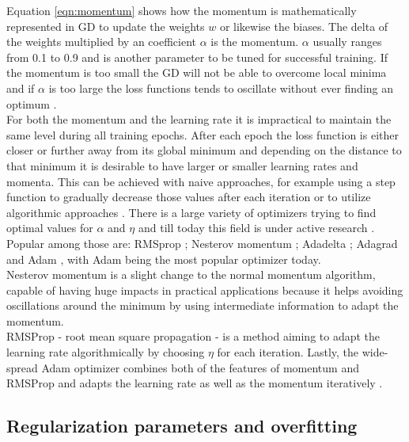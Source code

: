 Equation \ref{eqn:momentum} shows how the momentum is mathematically represented in GD to
update the weights $w$ or likewise the biases. The delta of the weights multiplied by an
coefficient $\alpha$ is the momentum. $\alpha$ usually ranges from 0.1 to 0.9 and is
another parameter to be tuned for successful training. If the momentum is too small the GD
will not be able to overcome local minima and if $\alpha$ is too large the loss functions tends to oscillate without ever finding an optimum \cite{lecun2015deep}. \\
For both the momentum and the learning rate it is impractical to maintain the same level
during all training epochs. After each epoch the loss function is either closer or further
away from its global minimum and depending on the distance to that minimum it is desirable
to have larger or smaller learning rates and momenta. This can be achieved with naive
approaches, for example using a step function to gradually decrease those values after
each iteration or to utilize algorithmic approaches \cite{michie1994machine}. There is a
large variety of optimizers trying to find optimal values for $\alpha$ and $\eta$ and till
today this field is under active research \cite{goodfellow2016deep}. Popular among those
are: RMSprop \cite{hinton2012neural}; Nesterov momentum \cite{dozat2016incorporating};
Adadelta \cite{zeiler2012adadelta}; Adagrad \cite{ruder2016overview} and Adam
\cite{kingma2014adam}, with Adam being the most popular
optimizer today. \\
Nesterov momentum is a slight change to the normal momentum algorithm, capable of having huge impacts in practical applications because it helps avoiding oscillations around the minimum by using intermediate information to adapt the momentum. \\
RMSProp - root mean square propagation - is a method aiming to adapt the learning rate
algorithmically by choosing $\eta$ for each iteration. Lastly, the wide-spread Adam
optimizer combines both of the features of momentum and RMSProp and adapts the learning
rate as well as the momentum iteratively \cite{kingma2014adam}.

\subsection{Regularization parameters and overfitting}

